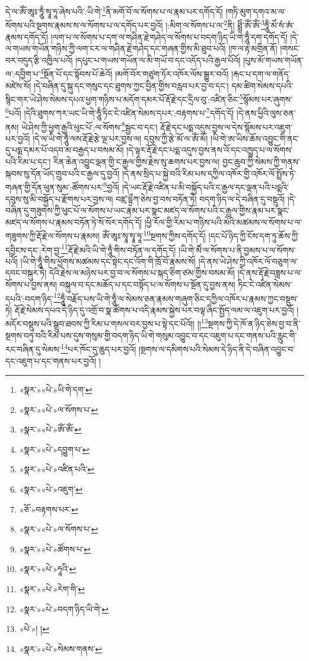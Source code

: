 དེ་ལ་ཨོཾ་ཨཱཿ་ཧཱུྃ་སྭཱ་ཧཱ་ཞེས་པའི་:ཡི་གེ་\footnote{«སྣར་»«པེ་»ཡི་གེ་དག་}ནི་མགོ་བོ་ལ་སོགས་པ་ལ་རྣམ་པར་དགོད་དོ། །གཏི་མུག་དགའ་མ་ལ་སོགས་པའི་སྔགས་རྣམས་ས་ལ་སོགས་པ་ལ་དགོད་པར་བྱའོ། །:མིག་ལ་སོགས་པ་ལ་\footnote{«སྣར་»«པེ་»ལ་སོགས་པ་}ནི། ཐླིཾ་ཨོཾ་ཨོཾ་\footnote{«སྣར་»«པེ་»ཨོཾ་ཨོཾ་}ཧཱུྃ་མེཾ་སཾ་ཨཾ་རྣམས་དགོད་དོ། །ལག་པ་ལ་སོགས་པ་དག་ལ་གཤིན་རྗེ་གཤེད་ལ་སོགས་པ་བདག་ཉིད་ཡི་གེ་ཧཱུྃ་དག་དགོད་དོ། །དེ་ལ་གཡས་གཡོན་གཉིས་ཀྱི་ལག་ངར་ལ་གཤིན་རྗེ་གཤེད་དང་གཞན་གྱིས་མི་ཐུབ་པའོ། །ཁ་ལ་རྟ་མགྲིན་ནོ། །གསང་བར་བདུད་རྩི་འཁྱིལ་པའོ། །དཔུང་པ་གཡས་གཡོན་ལ་མི་གཡོ་བ་དང་འདོད་པའི་རྒྱལ་པོའོ། །པུས་མོ་གཡས་གཡོན་ལ་:དབྱིག་པ་\footnote{«སྣར་»«པེ་»དབྱུག་པ་}སྔོན་པོ་དང་སྟོབས་པོ་ཆེའོ། །མགོ་བོར་གཙུག་ཏོར་འཁོར་ལོས་སྒྱུར་བའོ། །རྐང་པ་དག་ལ་གནོད་མཛེས་སོ། །དེ་བཞིན་དུ་སྐུ་དང་གསུང་དང་ཐུགས་ཀྱང་བྱིན་གྱིས་བརླབ་པར་བྱ་བ་དང་། དམ་ཚིག་སེམས་དཔའི་སྙིང་གར་ཡེ་ཤེས་སེམས་དཔའ་ཕྱག་གཉིས་པ་མདོག་དམར་པོ་རྡོ་རྗེ་དང་དྲིལ་བུ་:འཛིན་ཅིང་\footnote{«སྣར་»«པེ་»འཛིན་པའི་}སྙོམས་པར་ཞུགས་\footnote{«སྣར་»«པེ་»འཇུག་}པའོ། །དེའི་ཐུགས་ཀར་ཡང་ཡི་གེ་ཧཱུྃ་ཏིང་ངེ་འཛིན་སེམས་དཔར་:བརྟགས་པ་\footnote{«ཅོ་»བརྟགས་པར་}དགོད་དོ། །དེ་ནས་ཕྱིའི་ལུས་ཅན་ནམ། ཡེ་ཤེས་ཀྱི་ཕྱག་རྒྱའི་ཕུང་པོ་:ལ་སོགས་\footnote{«སྣར་»«པེ་»ལ་སོགས་པ་}སྦྱང་བ་དང་། རྡོ་རྗེ་དང་པདྨ་འདུས་བྱས་ལ་དེས་སྙོམས་པར་འཇུག་པར་བྱའོ། །དེ་ལ་ཡི་གེ་ཧཱུྃ་ལས་རྡོ་རྗེ་རྩེ་ལྔ་པར་བྱས་ལ། དབུས་ཀྱི་རྩེ་མོ་ལ་ཨོཾ་མོ། །ཡི་གེ་ཨ་ཡིས་ཆོས་འབྱུང་གི་ནང་དུ་པདྨ་དམར་པོ་འདབ་མ་བརྒྱད་པ་བསམ་མོ། །དེ་ལྟར་རྡོ་རྗེ་དང་པདྨ་འདུས་བྱས་ནས་འོ་དང་འཁྱུད་པ་ལ་སོགས་པའི་རིམ་པ་དང་། རིན་ཆེན་འབྱུང་ལྡན་གྱི་ང་རྒྱལ་གྱིས་རྗེས་སུ་ཆགས་པར་བྱས་ལ། བྱང་ཆུབ་ཀྱི་སེམས་ཀྱི་གནས་སྐབས་སུ་དོན་ཡོད་གྲུབ་པའི་ང་རྒྱལ་དུ་བྱའོ། །དེ་ནས་སྲིད་པ་སྐྱེ་བའི་རིམ་པས་དཀྱིལ་འཁོར་གྱི་འཁོར་ལོ་སྤྲོས་ཏེ་གཞན་གྱི་དོན་ཕུན་སུམ་:ཚོགས་པར་\footnote{«སྣར་»«པེ་»ཚོགས་པ་}བྱའོ། །དེ་ཡང་རྡོ་རྗེ་འཛིན་པ་མི་བསྐྱོད་པའི་ང་རྒྱལ་དང་ལྡན་པའི་པདྨའི་དབུས་སུ་མི་བསྐྱོད་པ་རྫོགས་པར་བྱས་ལ། བཛྲ་དྷྲྀཀ་ཅེས་བྱ་བས་བཏོན་ཏེ། བདག་ཉིད་ལ་དེ་བཞིན་དུ་བསྡུའོ། །དེ་བཞིན་དུ་གཟུགས་ཀྱི་ཕུང་པོ་ལ་སོགས་པ་ཡང་རྣམ་པར་སྣང་མཛད་ལ་སོགས་པའི་ང་རྒྱལ་གྱིས་རྣམ་པར་སྣང་མཛད་ལ་སོགས་པ་རྣམས་བཏོན་ཏེ་སོ་སོར་དགོད་དོ། །ཕྱི་རོལ་གྱི་རིམ་པ་གཉིས་པའི་མེའི་མཚམས་ལ་སོགས་པ་ལ་གཟུགས་ཀྱི་རྡོ་རྗེ་ལ་སོགས་པ་རྣམས། ཨོཾ་ཨཱཿ་སྭཱ་སྭཱ་ཧཱ་\footnote{«སྣར་»«པེ་»ཧཱའི་}སྔགས་ཀྱིས་དགོད་དོ། །དང་པོ་ཉིད་ཀྱི་ངོས་དག་ཏུ་ཆོས་ཀྱི་དབྱིངས་དང་:རེག་བྱ་\footnote{«སྣར་»«པེ་»རེག་གི་}རྡོ་རྗེ་མའི་ཡི་གེ་ཧཱུྃ་གིས་བཏོན་ལ་དགོད་དོ། །ཡི་གེ་མཻཾ་ལ་སོགས་པ་ནི་བྱམས་པ་ལ་སོགས་པའོ། །ཡི་གེ་ཧཱུྃ་གིས་ཕྱོགས་མཚམས་དང་སྟེང་དང་འོག་གི་ཁྲོ་བོ་རྣམས་སོ། །དེ་ནས་ཡེ་ཤེས་ཀྱི་འཁོར་ལོ་བཅུག་ལ་དབང་བསྐུར་ཏེ། དེའི་རྗེས་ལ་མཉེས་པར་བྱ་བ་ལ་སོགས་པ་སྐད་ཅིག་ཙམ་གྱིས་བསམ་མོ། །དེ་ནས་རྡོ་རྗེ་བཟླས་པ་ལ་སོགས་པ་བྱས་ནས། བསྐུལ་བ་དང་མཆོད་པ་དང་བསྟོད་པ་ལ་སོགས་པ་སྔོན་དུ་བྱས་ནས། ཏིང་ངེ་འཛིན་སེམས་དཔའི་:བདག་ཉིད་\footnote{«སྣར་»«པེ་»བདག་ཉིད་ཡི་གེ་}ཧཱུྃ་བརྗོད་པས་ཡི་གེ་ཧཱུྃ་ལ་སེམས་ཅན་རྣམས་གཞུག་ཅིང་དཀྱིལ་འཁོར་པ་རྣམས་ཀྱང་བསྡུས་ཏེ། རྡོ་རྗེ་སེམས་དཔའ་དེ་ཉིད་དུ་འགྲོ་བ་སྣ་ཚོགས་པ་འདི་རྣམས་སྐྱེས་པར་བལྟ་ཞིང་སྤྱོད་ལམ་ལ་འཇུག་པར་བྱའོ། །མདོར་བསྡུས་པའི་སྒྲུབ་ཐབས་ཀྱི་རིམ་པ་གསལ་བར་བྱས་པ་སྟེ་དང་པོའོ།། །།\footnote{«པེ་»། །}སྔགས་ཀྱི་དེ་ཁོ་ན་ཉིད་ཅེས་བྱ་བ་ནི་སྔགས་བཏུ་བའི་རིམ་པས་དུས་གསུམ་གྱི་བདག་ཉིད་ཡི་གེ་གསུམ་འབྱུང་བ་དང་འཇུག་པ་དང་གནས་པའི་རླུང་གི་རང་བཞིན་དུ་སེམས་\footnote{«སྣར་»«པེ་»སེམས་གནས་}པར་ཁོང་དུ་ཆུད་པར་བྱའོ། །སྔགས་ལ་དམིགས་པའི་སེམས་དེ་ཉིད་ནི་དེ་བཞིན་འབྱུང་བ་དང་འཇུག་པ་དང་གནས་པར་བྱའོ། །
